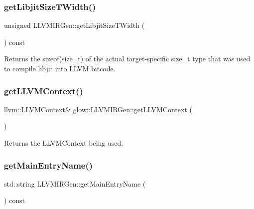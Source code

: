 \subsubsection{\texorpdfstring{get\+Libjit\+Size\+T\+Width()}{getLibjitSizeTWidth()}}
{\footnotesize\ttfamily unsigned L\+L\+V\+M\+I\+R\+Gen\+::get\+Libjit\+Size\+T\+Width (\begin{DoxyParamCaption}{ }\end{DoxyParamCaption}) const}

\begin{DoxyReturn}{Returns}
the sizeof(size\+\_\+t) of the actual target-\/specific size\+\_\+t type that was used to compile libjit into L\+L\+VM bitcode. 
\end{DoxyReturn}
\mbox{\label{classglow_1_1_l_l_v_m_i_r_gen_a07a0810110612b078218a35bb4673c99}} 
\subsubsection{\texorpdfstring{get\+L\+L\+V\+M\+Context()}{getLLVMContext()}}
{\footnotesize\ttfamily llvm\+::\+L\+L\+V\+M\+Context\& glow\+::\+L\+L\+V\+M\+I\+R\+Gen\+::get\+L\+L\+V\+M\+Context (\begin{DoxyParamCaption}{ }\end{DoxyParamCaption})\hspace{0.3cm}{\ttfamily [inline]}}

\begin{DoxyReturn}{Returns}
the L\+L\+V\+M\+Context being used. 
\end{DoxyReturn}
\mbox{\label{classglow_1_1_l_l_v_m_i_r_gen_a7d552d8a207ea84b2e1c24585646df74}} 
\subsubsection{\texorpdfstring{get\+Main\+Entry\+Name()}{getMainEntryName()}}
{\footnotesize\ttfamily std\+::string L\+L\+V\+M\+I\+R\+Gen\+::get\+Main\+Entry\+Name (\begin{DoxyParamCaption}{ }\end{DoxyParamCaption}) const}

